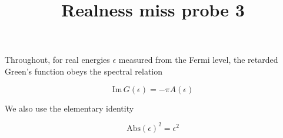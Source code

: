 \documentclass{article}
\begin{document}
\title{Realness miss probe 3}
\maketitle

Throughout, for real energies $\epsilon$ measured from the Fermi level,
the retarded Green's function obeys the spectral relation

\begin{equation}
\label{eq:spectral}
\mathrm{Im}\, G(\epsilon) = -\pi A(\epsilon)
\end{equation}

We also use the elementary identity

\begin{equation}
\label{eq:abssq}
\mathrm{Abs}(\epsilon)^2 = \epsilon^2
\end{equation}
\end{document}
